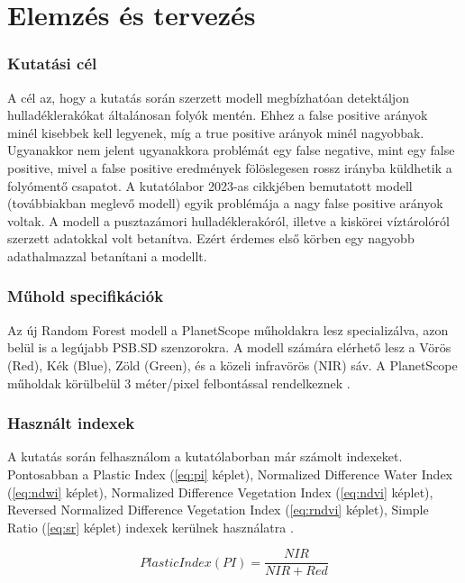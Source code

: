 \chapter{Elemzés és tervezés}
\label{ch:spec}

\subsection{Kutatási cél}
\label{ch:goals}

A cél az, hogy a kutatás során szerzett modell megbízhatóan detektáljon hulladéklerakókat általánosan folyók mentén. Ehhez a false positive arányok minél kisebbek kell legyenek, míg a true positive arányok minél nagyobbak. Ugyanakkor nem jelent ugyanakkora problémát egy false negative, mint egy false positive, mivel a false positive eredmények fölöslegesen rossz irányba küldhetik a folyómentő csapatot. 
A kutatólabor 2023-as cikkjében bemutatott modell (továbbiakban meglevő modell) egyik problémája a nagy false positive arányok voltak. A modell a pusztazámori hulladéklerakóról, illetve a kiskörei víztárolóról szerzett adatokkal volt betanítva. Ezért érdemes első körben egy nagyobb adathalmazzal betanítani a modellt.

\subsection{Műhold specifikációk}

Az új Random Forest modell a PlanetScope műholdakra lesz specializálva, azon belül is a legújabb PSB.SD szenzorokra\cite{planetsensors2024}. A modell számára elérhető lesz a Vörös (Red), Kék (Blue), Zöld (Green), és a közeli infravörös (NIR) sáv. A PlanetScope műholdak körülbelül 3 méter/pixel felbontással rendelkeznek \cite{planetresolution2024}.

\subsection{Használt indexek}

A kutatás során felhasználom a kutatólaborban már számolt indexeket. Pontosabban a Plastic Index (\ref{eq:pi} képlet), Normalized Difference Water Index (\ref{eq:ndwi} képlet), Normalized Difference Vegetation Index (\ref{eq:ndvi} képlet), Reversed Normalized Difference Vegetation Index (\ref{eq:rndvi} képlet), Simple Ratio (\ref{eq:sr} képlet) indexek kerülnek használatra \cite{Themistocleous2020, magyar2023}.

\begin{equation}\label{eq:pi}
    Plastic Index (PI) = \frac{NIR}{NIR + Red}
\end{equation}

